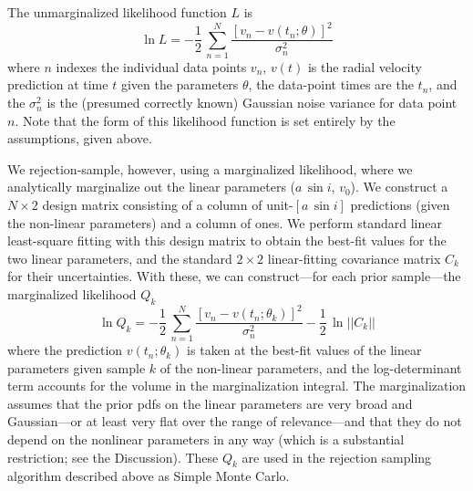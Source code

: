 \documentclass[12pt, preprint]{aastex}
\newcommand{\asini}{\ensuremath{a\,\sin i}}
\begin{document}
The unmarginalized likelihood function $L$ is
\begin{equation}
\ln L = -\frac{1}{2}\,\sum_{n=1}^N \frac{[v_n - v(t_n;\theta)]^2}{\sigma_n^2}
\end{equation}
where $n$ indexes the individual data points $v_n$, $v(t)$ is the
radial velocity prediction at time $t$ given the parameters $\theta$, the
data-point times are the $t_n$, and the $\sigma_n^2$ is the (presumed
correctly known) Gaussian noise variance for data point $n$.
Note that the form of this likelihood function is set entirely by
the assumptions, given above.

We rejection-sample, however, using a marginalized likelihood, where
we analytically marginalize out the linear parameters ($\asini$,
$v_0$).
We construct a $N\times 2$ design matrix consisting of a column of
unit-$[\asini]$ predictions (given the non-linear parameters) and a
column of ones.
We perform standard linear least-square fitting with this design
matrix to obtain the best-fit values for the two linear parameters,
and the standard $2\times 2$ linear-fitting covariance matrix $C_k$ for their
uncertainties.
With these, we can construct---for each prior sample---the marginalized likelihood $Q_k$
\begin{equation}
\ln Q_k = -\frac{1}{2}\,\sum_{n=1}^N \frac{[v_n - v(t_n;\theta_k)]^2}{\sigma_n^2} -\frac{1}{2}\,\ln ||C_k||
\end{equation}
where the prediction $v(t_n;\theta_k)$ is taken at the best-fit values
of the linear parameters given sample $k$ of the non-linear
parameters, and the log-determinant term accounts for the volume in
the marginalization integral.
The marginalization assumes that the prior pdfs on the linear parameters
are very broad and Gaussian---or
at least very flat over the range of relevance---and that they do not depend
on the nonlinear parameters in any way (which is a substantial restriction;
see the Discussion).
These $Q_k$ are used in the rejection sampling algorithm described above
as Simple Monte Carlo.
\end{document}

